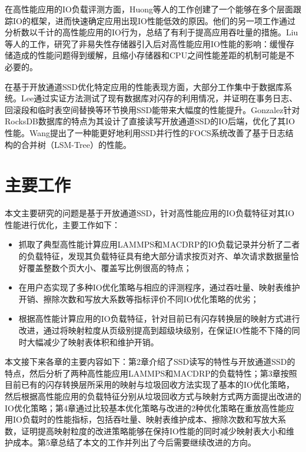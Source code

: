 在高性能应用的IO负载评测方面，Huong等人的工作\cite{luu_multi-level_nodate}创建了一个能够在多个层面跟踪IO的框架，进而快速确定应用出现IO性能低效的原因。他们的另一项工作\cite{luu_multiplatform_2015}通过分析数以千计的高性能应用的IO行为，总结了有利于提高应用吞吐量的措施。Liu等人的工作\cite{liu_performance_2017}，研究了非易失性存储器引入后对高性能应用IO性能的影响：缓慢存储造成的性能问题得到缓解，且缩小存储器和CPU之间性能差距的机制可能是不必要的。

在基于开放通道SSD优化特定应用的性能表现方面，大部分工作集中于数据库系统。Lee\cite{lee_case_2008}通过实证方法测试了现有数据库对闪存的利用情况，并证明在事务日志、回滚段和临时表空间替换等环节换用SSD能带来大幅度的性能提升。Gonzalez\cite{gonzalez_towards_nodate}针对RocksDB数据库的特点为其设计了直接读写开放通道SSD的IO后端，优化了其IO性能。Wang\cite{wang_efficient_2014}提出了一种能更好地利用SSD并行性的FOCS系统改善了基于日志结构的合并树（LSM-Tree）的性能。

\section{主要工作}
本文主要研究的问题是基于开放通道SSD，针对高性能应用的IO负载特征对其IO性能进行优化，主要工作如下：
\begin{itemize}
    \item 抓取了典型高性能计算应用LAMMPS和MACDRP的IO负载记录并分析了二者的负载特征，发现其负载特征具有绝大部分请求按页对齐、单次请求数据量恰好覆盖整数个页大小、覆盖写比例很高的特点；
    \item 在用户态实现了多种IO优化策略与相应的评测程序，通过吞吐量、映射表维护开销、擦除次数和写放大系数等指标评价不同IO优化策略的优劣；
    \item 根据高性能计算应用的IO负载特征，针对目前已有闪存转换层的映射方式进行改进，通过将映射粒度从页级别提高到超级块级别，在保证IO性能不下降的同时大幅减少了映射表体积和维护开销。
\end{itemize}

本文接下来各章的主要内容如下：第2章介绍了SSD读写的特性与开放通道SSD的特点，然后分析了两种高性能应用LAMMPS和MACDRP的负载特性；第3章按照目前已有的闪存转换层所采用的映射与垃圾回收方法实现了基本的IO优化策略，然后根据高性能应用的负载特征分别从垃圾回收方式与映射方式两方面提出改进的IO优化策略；第4章通过比较基本优化策略与改进的2种优化策略在重放高性能应用IO负载时的性能指标，包括吞吐量、映射表维护成本、擦除次数和写放大系数，证明提高映射粒度的改进策略能够在保持IO性能的同时减少映射表大小和维护成本。第5章总结了本文的工作并列出了今后需要继续改进的方向。